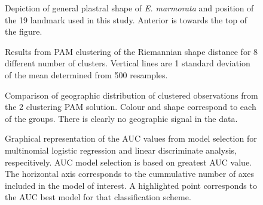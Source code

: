 \documentclass[12pt,letterpaper]{article}
\begin{document}
\begin{table}[ht]
  \centering
  \caption{Results from classification model estimates of the secondary, multi-species dataset. Models are random forest (RF), linear discriminate analysis (LDA), and multinomial logistic regression (MLR). Comparison of in-sample and out-of-sample AUC of the best performing model, along with the number of predictors. AUC values range between 0.5 (no better than random) and 1 (perfect classification).}
  \label{tab:second_res}
\end{table}

\clearpage

\begin{figure}[ht]
  \centering
  \caption{Depiction of general plastral shape of \textit{E. marmorata} and position of the 19 landmark used in this study. Anterior is towards the top of the figure.}
  \label{fig:plastra}
\end{figure}

\begin{figure}[ht]
  \centering
  \caption{Results from PAM clustering of the Riemannian shape distance for 8 different number of clusters. Vertical lines are 1 standard deviation of the mean determined from 500 resamples.}
  \label{fig:gap}
\end{figure}

\begin{figure}[ht]
  \centering
  \caption{Comparison of geographic distribution of clustered observations from the 2 clustering PAM solution. Colour and shape correspond to each of the groups. There is clearly no geographic signal in the data.}
  \label{fig:gap_map}
\end{figure}

\begin{figure}[ht]
  \centering
  \caption{Graphical representation of the AUC values from model selection for multinomial logistic regression and linear discriminate analysis, respecitively. AUC model selection is based on greatest AUC value. The horizontal axis corresponds to the cummulative number of axes included in the model of interest. A highlighted point corresponds to the AUC best model for that classification scheme.}
  \label{fig:sel}
\end{figure}
\end{document}
